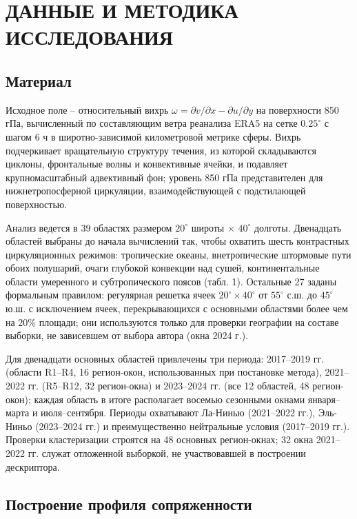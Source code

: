 \documentclass[12pt,a4paper]{article}
\begin{document}
\section{ДАННЫЕ И МЕТОДИКА ИССЛЕДОВАНИЯ}

\subsection{Материал}

Исходное поле -- относительный вихрь $\omega = \partial v/\partial x - \partial u/\partial y$ на поверхности 850 гПа, вычисленный по составляющим ветра реанализа ERA5 \cite{Hersbach2020,Soci2024} на сетке $0.25^\circ$ с шагом 6 ч в широтно-зависимой километровой метрике сферы. Вихрь подчеркивает вращательную структуру течения, из которой складываются циклоны, фронтальные волны и конвективные ячейки, и подавляет крупномасштабный адвективный фон; уровень 850 гПа представителен для нижнетропосферной циркуляции, взаимодействующей с подстилающей поверхностью.

Анализ ведется в 39 областях размером $20^\circ$ широты $\times$ $40^\circ$ долготы. Двенадцать областей выбраны до начала вычислений так, чтобы охватить шесть контрастных циркуляционных режимов: тропические океаны, внетропические штормовые пути обоих полушарий, очаги глубокой конвекции над сушей, континентальные области умеренного и субтропического поясов (табл. 1). Остальные 27 заданы формальным правилом: регулярная решетка ячеек $20^\circ \times 40^\circ$ от $55^\circ$ с.ш. до $45^\circ$ ю.ш. с исключением ячеек, перекрывающихся с основными областями более чем на 20\% площади; они используются только для проверки географии на составе выборки, не зависевшем от выбора автора (окна 2024 г.).

Для двенадцати основных областей привлечены три периода: 2017--2019 гг. (области R1--R4, 16 регион-окон, использованных при постановке метода), 2021--2022 гг. (R5--R12, 32 регион-окна) и 2023--2024 гг. (все 12 областей, 48 регион-окон); каждая область в итоге располагает восемью сезонными окнами января--марта и июля--сентября. Периоды охватывают Ла-Нинью (2021--2022 гг.), Эль-Ниньо (2023--2024 гг.) и преимущественно нейтральные условия (2017--2019 гг.). Проверки кластеризации строятся на 48 основных регион-окнах; 32 окна 2021--2022 гг. служат отложенной выборкой, не участвовавшей в построении дескриптора.

\subsection{Построение профиля сопряженности}
\end{document}
